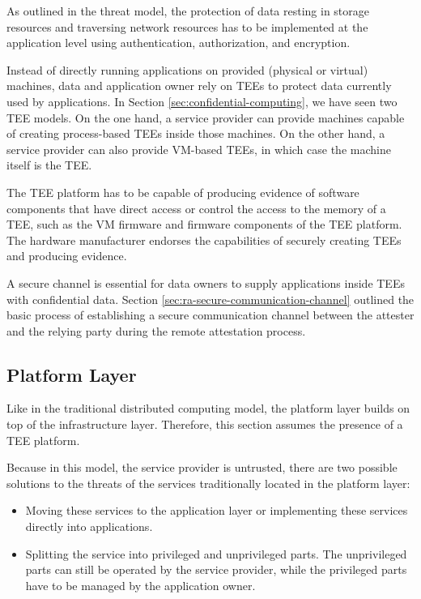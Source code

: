 As outlined in the threat model, the protection of data resting in storage
resources and traversing network resources has to be implemented at the
application level using authentication, authorization, and encryption.

Instead of directly running applications on provided (physical or virtual)
machines, data and application owner rely on TEEs to protect data currently used
by applications. In Section \ref{sec:confidential-computing}, we have seen two
TEE models. On the one hand, a service provider can provide machines capable of
creating process-based TEEs inside those machines. On the other hand, a service
provider can also provide VM-based TEEs, in which case the machine itself is the
TEE.

The TEE platform has to be capable of producing evidence of software components
that have direct access or control the access to the memory of a TEE, such as
the VM firmware and firmware components of the TEE platform. The hardware
manufacturer endorses the capabilities of securely creating TEEs and producing
evidence.

A secure channel is essential for data owners to supply applications inside TEEs
with confidential data. Section \ref{sec:ra-secure-communication-channel}
outlined the basic process of establishing a secure communication channel
between the attester and the relying party during the remote attestation
process.

\subsection{Platform Layer}

Like in the traditional distributed computing model, the platform layer builds
on top of the infrastructure layer. Therefore, this section assumes the presence
of a TEE platform.

Because in this model, the service provider is untrusted, there are two possible
solutions to the threats of the services traditionally located in the platform
layer:

\begin{itemize}
  \item Moving these services to the application layer or implementing these
        services directly into applications.
  \item Splitting the service into privileged and unprivileged parts. The
        unprivileged parts can still be operated by the service provider, while
        the privileged parts have to be managed by the application owner.
\end{itemize}

